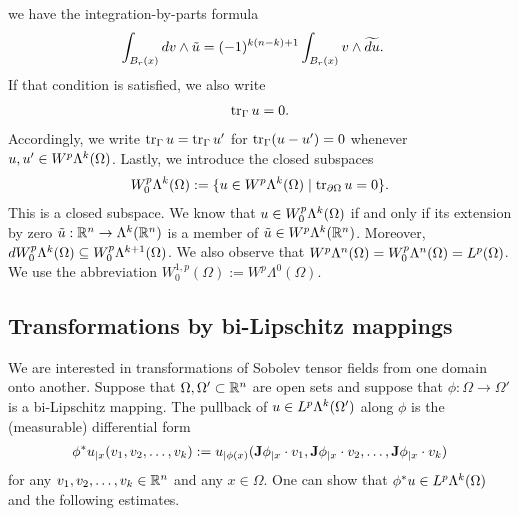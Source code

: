 \documentclass[10pt,a4paper]{article}
\newcommand\cye[1]{%
\protect\leavevmode
\begingroup
    \color{blue}%
    #1%
\endgroup
}
\begin{document}
we have the integration-by-parts formula
\begin{align*}
    \int_{B_r(x)} d v \wedge \tilde u
    &=
    (-1)^{k(n-k)+1}
    \int_{B_r(x)} v \wedge \widetilde{d u}
    .
\end{align*}
If that condition is satisfied, we also write 
\begin{align*}
    \operatorname{tr}_{\Gamma} u = 0
    .
\end{align*}
Accordingly, we write $\operatorname{tr}_{\Gamma} u = \operatorname{tr}_{\Gamma} u'$ for $\operatorname{tr}_{\Gamma} (u-u') = 0$ whenever $u, u' \in W^{p}\Lambda^{k}(\Omega)$.
Lastly, we introduce the closed subspaces 
\begin{gather*}
    W^{p}_{0}\Alt^{k}(\Omega) 
    := 
    \{ u \in W^{p}\Alt^{k}(\Omega) \suchthat \trace_{\partial \Omega} u = 0 \}
    .
\end{gather*}
This is a closed subspace. We know that $u \in W^{p}_{0}\Lambda^{k}(\Omega)$ if and only if its extension by zero $\tilde u : {\mathbb R}^{n} \rightarrow \Lambda^{k}({\mathbb R}^{n})$ is a member of $\tilde u \in W^{p}\Lambda^{k}({\mathbb R}^{n})$. Moreover, $d W^{p}_{0}\Lambda^{k}(\Omega) \subseteq W^{p}_{0}\Lambda^{k+1}(\Omega)$. We also observe that $W^{p}\Lambda^{n}(\Omega) = W^{p}_{0}\Lambda^{n}(\Omega) = L^{p}(\Omega)$. We use the abbreviation $W^{1,p}_{0}(\Omega) := W^{p}\Lambda^{0}(\Omega)$. 


\subsection{Transformations by bi-Lipschitz mappings}

We are interested in transformations of Sobolev tensor fields from one domain onto another. 
Suppose that $\Omega,\Omega' \subset {\mathbb R}^{n}$ are open sets and suppose that $\phi: \Omega \to \Omega'$ is a bi-Lipschitz mapping.
The pullback of $u \in L^{p}\Lambda^{k}(\Omega')$ along $\phi$ is the (measurable) differential form 
\begin{align} \label{equation:pullback}
    \phi^{\ast}u_{|x}( v_{1}, v_{2}, \ldots, v_{k} ) 
    := 
    u_{|\phi(x)}( {\mathbf{J}}\phi_{|x} \cdot v_1, {\mathbf{J}}\phi_{|x} \cdot v_2, \ldots, {\mathbf{J}}\phi_{|x} \cdot v_k ) 
\end{align}
for any $v_1, v_2, \dots, v_k \in {\mathbb R}^{n}$ and any $x \in \Omega$. 
One can show that $\phi^{\ast}u \in L^{p}\Lambda^{k}(\Omega)$ and the following estimates.
\end{document}
